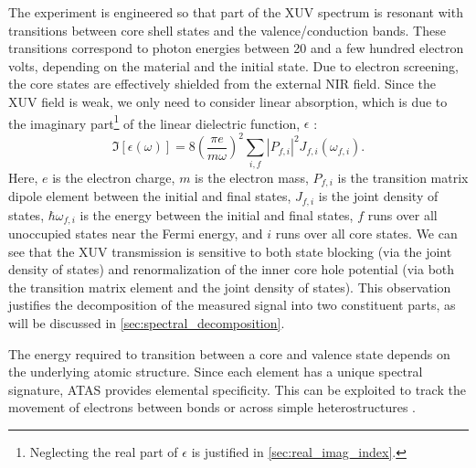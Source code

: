 The experiment is engineered so that part of the XUV spectrum is resonant with transitions between core shell states and the valence/conduction bands. These transitions correspond to photon energies between 20 and a few hundred electron volts, depending on the material and the initial state. Due to electron screening, the core states are effectively shielded from the external NIR field. Since the XUV field is weak, we only need to consider linear absorption, which is due to the imaginary part\footnote{Neglecting the real part of $\epsilon$ is justified in \cref{sec:real_imag_index}.} of the linear dielectric function, $\epsilon$ \cite{kaplanFemtosecondTrackingCarrier2018}:
\begin{equation}
	\label{eqn:imag_linear_dielectric_func}
\Im \left[ \epsilon (\omega) \right] = 8 \left( \frac{\pi e}{m \omega}\right)^2 \sum_{i,f}  \left| P_{f,i} \right|^2 J_{f,i}(\omega_{f,i}).
\end{equation}
Here, $e$ is the electron charge, $m$ is the electron mass, $P_{f,i}$ is the transition matrix dipole element between the initial and final states, $J_{f,i}$ is the joint density of states, $\hbar \omega_{f,i}$ is the energy between the initial and final states, $f$ runs over all unoccupied states near the Fermi energy, and $i$ runs over all core states. We can see that the XUV transmission is sensitive to both state blocking (via the joint density of states) and renormalization of the inner core hole potential (via both the transition matrix element and the joint density of states). This observation justifies the decomposition of the measured signal into two constituent parts, as will be discussed in \cref{sec:spectral_decomposition}.

The energy required to transition between a core and valence state depends on the underlying atomic structure. Since each element has a unique spectral signature, ATAS provides elemental specificity. This can be exploited to track the movement of electrons between bonds or across simple heterostructures \cite{marshUltrafastTimeresolvedExtreme2018,cushingLayerresolvedUltrafastExtreme2020}.

